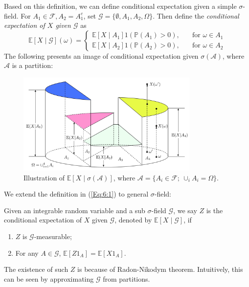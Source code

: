 Based on this definition, we can define conditional expectation given a simple $\sigma$-field.
For $A_1\in\mathcal{F}, A_2=A_1^c$, set $\mathcal{G}=\{\emptyset,A_1,A_2,\Omega\}$.
Then define the \emph{conditional expectation of $X$ given $\mathcal{G}$} as
\begin{equation}\label{Eq:6:1}
\mathbb{E}[X\mid \mathcal{G}](\omega)=\left\{
\begin{aligned}
\mathbb{E}[X\mid A_1]1(\mathbb{P}(A_1)>0),&\quad\text{for $\omega\in A_1$}\\
\mathbb{E}[X\mid A_2]1(\mathbb{P}(A_2)>0),&\quad\text{for $\omega\in A_2$}
\end{aligned}
\right.
\end{equation}
The following presents an image of conditional expectation given $\sigma(\mathcal{A})$, where $\mathcal{A}$ is a partition:
\begin{figure}[H]
\centering
\includegraphics[width=0.8\textwidth]{week6/p_2}
\caption{Illustration of $\mathbb{E}[X\mid \sigma(\mathcal{A})]$,
where $\mathcal{A}=\{A_i\in\mathcal{F};~\cup_iA_i=\Omega\}$.
}
\end{figure}
We extend the definition in (\ref{Eq:6:1}) to general $\sigma$-field:
\begin{definition}\label{Def:6:2}
Given an integrable random variable and a sub $\sigma$-field $\mathcal{G}$, 
we say $Z$ is the conditional expectation of $X$ given $\mathcal{G}$, denoted by $\mathbb{E}[X\mid \mathcal{G}]$, if
\begin{enumerate}
\item
$Z$ is $\mathcal{G}$-measurable;
\item
For any $A\in\mathcal{G}$, $\mathbb{E}[Z1_A] = \mathbb{E}[X1_A]$.
\end{enumerate}
\end{definition}
The existence of such $Z$ is because of Radon-Nikodym theorem. Intuitively, this can be seen by approximating $\mathcal{G}$ from partitions.

